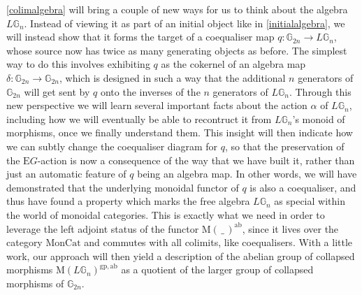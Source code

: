 \cref{colimalgebra} will bring a couple of new ways for us to think about the algebra $L\mathbb{G}_n$. Instead of viewing it as part of an initial object like in \cref{initialalgebra}, we will instead show that it forms the target of a coequaliser map $q: \mathbb{G}_{2n} \to L\mathbb{G}_n$, whose source now has twice as many generating objects as before. The simplest way to do this involves exhibiting $q$ as the cokernel of an algebra map $\delta: \mathbb{G}_{2n} \to \mathbb{G}_{2n}$, which is designed in such a way that the additional $n$ generators of $\mathbb{G}_{2n}$ will get sent by $q$ onto the inverses of the $n$ generators of $L\mathbb{G}_n$. Through this new perspective we will learn several important facts about the action $\alpha$ of $L\mathbb{G}_n$, including how we will eventually be able to recontruct it from $L\mathbb{G}_n$'s monoid of morphisms, once we finally understand them. This insight will then indicate how we can subtly change the coequaliser diagram for $q$, so that the preservation of the $\mathrm{E}G$-action is now a consequence of the way that we have built it, rather than just an automatic feature of $q$ being an algebra map. In other words, we will have demonstrated that the underlying monoidal functor of $q$ is also a coequaliser, and thus have found a property which marks the free algebra $L\mathbb{G}_n$ as special within the world of monoidal categories. This is exactly what we need in order to leverage the left adjoint status of the functor $\mathrm{M}( \, \_ \,)^{\mathrm{ab}}$, since it lives over the category $\mathrm{MonCat}$ and commutes with all colimits, like coequalisers. With a little work, our approach will then yield a description of the abelian group of collapsed morphisms $\mathrm{M}(L\mathbb{G}_n)^{\mathrm{gp},\mathrm{ab}}$ as a quotient of the larger group of collapsed morphisms of $\mathbb{G}_{2n}$.

